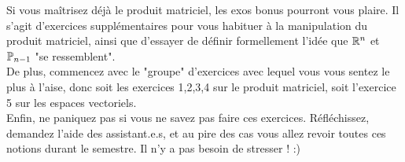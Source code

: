\begin{center}
\begin{tcolorbox}[boxrule=0pt,frame empty,width=\textwidth]
Si vous maîtrisez déjà le produit matriciel, les exos bonus pourront vous plaire. Il s'agit d'exercices supplémentaires pour vous habituer à la manipulation du produit matriciel, ainsi que d'essayer de définir formellement l'idée que $\R^n$ et $\P_{n-1}$ "se ressemblent". \\

De plus, commencez avec le "groupe" d'exercices avec lequel vous vous sentez le plus à l'aise, donc soit les exercices 1,2,3,4 sur le produit matriciel, soit l'exercice 5 sur les espaces vectoriels. \\

Enfin, ne paniquez pas si vous ne savez pas faire ces exercices. Réfléchissez, demandez l'aide des assistant.e.s, et au pire des cas vous allez revoir toutes ces notions durant le semestre. Il n'y a pas besoin de stresser ! :)
\end{tcolorbox}
\end{center}


